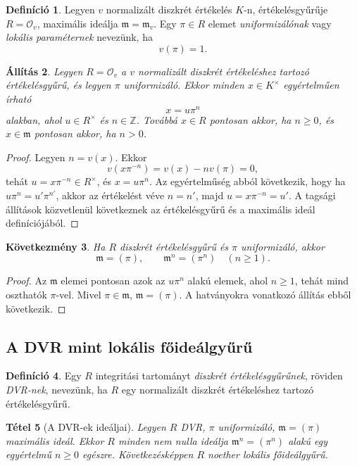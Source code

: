\documentclass[11pt,a4paper]{article}
\newtheorem{tetel}{Tétel}[section]
\newtheorem{allitas}[tetel]{Állítás}
\newtheorem{kovetkezmeny}[tetel]{Következmény}
\theoremstyle{definition}
\newtheorem{definicio}[tetel]{Definíció}
\newcommand{\OO}{\mathcal O}
\newcommand{\mm}{\mathfrak m}
\newcommand{\ZZ}{\mathbb Z}
\begin{document}
\begin{definicio}
Legyen $v$ normalizált diszkrét értékelés $K$-n, értékelésgyűrűje
$R=\OO_v$, maximális ideálja $\mm=\mm_v$. Egy $\pi\in R$ elemet
\emph{uniformizálónak} vagy \emph{lokális paraméternek} nevezünk, ha
\[
  v(\pi)=1.
\]
\end{definicio}

\begin{allitas}
Legyen $R=\OO_v$ a $v$ normalizált diszkrét értékeléshez tartozó
értékelésgyűrű, és legyen
$\pi$ uniformizáló. Ekkor minden $x\in K^\times$ egyértelműen írható
\[
  x=u\pi^n
\]
alakban, ahol $u\in R^\times$ és $n\in\ZZ$. Továbbá $x\in R$ pontosan
akkor, ha $n\geq 0$, és $x\in\mm$ pontosan akkor, ha $n>0$.
\end{allitas}

\begin{proof}
Legyen $n=v(x)$. Ekkor
\[
  v(x\pi^{-n})=v(x)-n v(\pi)=0,
\]
tehát $u=x\pi^{-n}\in R^\times$, és $x=u\pi^n$. Az egyértelműség
abból következik, hogy ha $u\pi^n=u'\pi^{n'}$, akkor az értékelést
véve $n=n'$, majd $u=x\pi^{-n}=u'$. A tagsági állítások közvetlenül következnek
az értékelésgyűrű és a maximális ideál definíciójából.
\end{proof}

\begin{kovetkezmeny}
Ha $R$ diszkrét értékelésgyűrű és $\pi$ uniformizáló, akkor
\[
  \mm=(\pi),
  \qquad
  \mm^n=(\pi^n)\quad (n\geq 1).
\]
\end{kovetkezmeny}

\begin{proof}
Az $\mm$ elemei pontosan azok az $u\pi^n$ alakú elemek, ahol
$n\geq 1$, tehát mind oszthatók $\pi$-vel. Mivel $\pi\in\mm$,
$\mm=(\pi)$. A hatványokra vonatkozó állítás ebből következik.
\end{proof}

\subsection{A DVR mint lokális főideálgyűrű}

\begin{definicio}
Egy $R$ integritási tartományt \emph{diszkrét értékelésgyűrűnek},
röviden \emph{DVR-nek}, nevezünk, ha $R$ egy normalizált diszkrét
értékeléshez tartozó értékelésgyűrű.
\end{definicio}

\begin{tetel}[A DVR-ek ideáljai]
Legyen $R$ DVR, $\pi$ uniformizáló, $\mm=(\pi)$ maximális ideál.
Ekkor $R$ minden nem nulla ideálja $\mm^n=(\pi^n)$ alakú egy
egyértelmű $n\geq 0$ egészre. Következésképpen $R$ noether lokális
főideálgyűrű.
\end{tetel}
\end{document}
